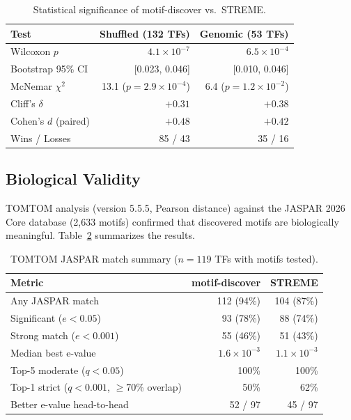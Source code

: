 \begin{table}[H]
\centering
\caption{Statistical significance of motif-discover vs.\ STREME.}
\label{tab:stats}
\small
\begin{tabular}{lrr}
\toprule
Test & Shuffled (132 TFs) & Genomic (53 TFs) \\
\midrule
Wilcoxon $p$         & $4.1 \times 10^{-7}$ & $6.5 \times 10^{-4}$ \\
Bootstrap 95\% CI    & [0.023, 0.046]       & [0.010, 0.046] \\
McNemar $\chi^2$     & 13.1 ($p = 2.9 \times 10^{-4}$) & 6.4 ($p = 1.2 \times 10^{-2}$) \\
Cliff's $\delta$     & $+0.31$              & $+0.38$ \\
Cohen's $d$ (paired) & $+0.48$              & $+0.42$ \\
Wins / Losses        & 85 / 43              & 35 / 16 \\
\bottomrule
\end{tabular}
\end{table}

\subsection{Biological Validity}

TOMTOM analysis (version 5.5.5, Pearson distance) against the JASPAR 2026 Core database (2{,}633 motifs) confirmed that discovered motifs are biologically meaningful. Table~\ref{tab:tomtom} summarizes the results.

\begin{table}[H]
\centering
\caption{TOMTOM JASPAR match summary ($n = 119$ TFs with motifs tested).}
\label{tab:tomtom}
\small
\begin{tabular}{lrr}
\toprule
Metric & motif-discover & STREME \\
\midrule
Any JASPAR match            & 112 (94\%) & 104 (87\%) \\
Significant ($e < 0.05$)    & 93 (78\%)  & 88 (74\%) \\
Strong match ($e < 0.001$)  & 55 (46\%)  & 51 (43\%) \\
Median best e-value         & $1.6 \times 10^{-3}$ & $1.1 \times 10^{-3}$ \\
Top-5 moderate ($q < 0.05$) & 100\% & 100\% \\
Top-1 strict ($q < 0.001$, $\geq$70\% overlap) & 50\% & 62\% \\
Better e-value head-to-head & 52 / 97 & 45 / 97 \\
\bottomrule
\end{tabular}
\end{table}

